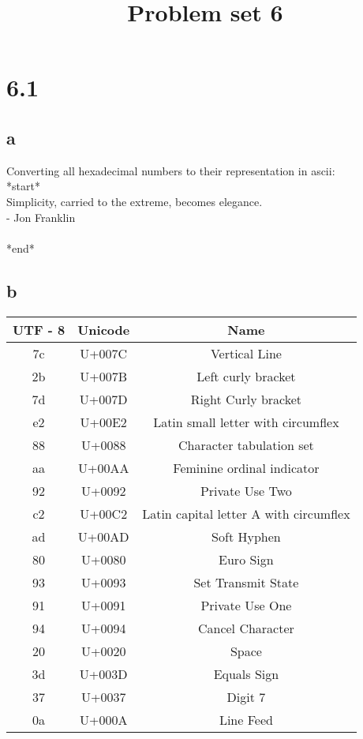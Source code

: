 \documentclass{article}
\begin{document}
\title{\textbf{Problem set 6}}
\maketitle

    \section{6.1}
    \subsection{a}
    Converting all hexadecimal numbers to their representation in ascii:\\
    *start*\\
    Simplicity, carried to the extreme, becomes elegance.\\
    - Jon Franklin\\
    \\
    *end*\\
    \subsection{b}
    \begin{center}
        \begin{tabular}{c c c}
            \hline
            UTF - 8 & Unicode & Name\\
            \hline
	        7c & U+007C & Vertical Line\\
            \hline
            2b & U+007B & Left curly bracket\\
            \hline
            7d & U+007D & Right Curly bracket\\
            \hline
            e2 & U+00E2 & Latin small letter with circumflex\\
            \hline
            88 & U+0088 & Character tabulation set\\
            \hline
            aa & U+00AA & Feminine ordinal indicator\\
            \hline
            92 & U+0092 & Private Use Two\\
            \hline
            c2 & U+00C2 & Latin capital letter A with circumflex\\
            \hline
            ad & U+00AD & Soft Hyphen\\
            \hline
            80 & U+0080 & Euro Sign\\
            \hline
            93 & U+0093 & Set Transmit State\\
            \hline
            91 & U+0091 & Private Use One\\
            \hline
            94 & U+0094 & Cancel Character\\
            \hline
            20 & U+0020 & Space\\
            \hline
            3d & U+003D & Equals Sign\\
            \hline
            37 & U+0037 & Digit 7\\
            \hline
            0a & U+000A & Line Feed\\
            \hline
        \end{tabular}
    \end{center}
\end{document}
